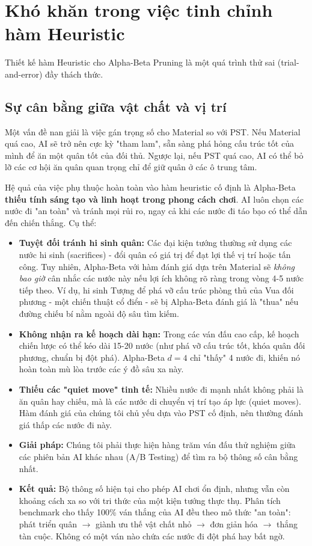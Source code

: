 \section{Khó khăn trong việc tinh chỉnh hàm Heuristic}

Thiết kế hàm Heuristic cho Alpha-Beta Pruning là một quá trình thử sai (trial-and-error) đầy thách thức. 

\subsection{Sự cân bằng giữa vật chất và vị trí}
Một vấn đề nan giải là việc gán trọng số cho Material so với PST. Nếu Material quá cao, AI sẽ trở nên cực kỳ "tham lam", sẵn sàng phá hỏng cấu trúc tốt của mình để ăn một quân tốt của đối thủ. Ngược lại, nếu PST quá cao, AI có thể bỏ lỡ các cơ hội ăn quân quan trọng chỉ để giữ quân ở các ô trung tâm. 

Hệ quả của việc phụ thuộc hoàn toàn vào hàm heuristic cố định là Alpha-Beta \textbf{thiếu tính sáng tạo và linh hoạt trong phong cách chơi}. AI luôn chọn các nước đi "an toàn" và tránh mọi rủi ro, ngay cả khi các nước đi táo bạo có thể dẫn đến chiến thắng. Cụ thể:

\begin{itemize}
    \item \textbf{Tuyệt đối tránh hi sinh quân:} Các đại kiện tướng thường sử dụng các nước hi sinh (sacrifices) - đổi quân có giá trị để đạt lợi thế vị trí hoặc tấn công. Tuy nhiên, Alpha-Beta với hàm đánh giá dựa trên Material sẽ \textit{không bao giờ} cân nhắc các nước này nếu lợi ích không rõ ràng trong vòng 4-5 nước tiếp theo. Ví dụ, hi sinh Tượng để phá vỡ cấu trúc phòng thủ của Vua đối phương - một chiến thuật cổ điển - sẽ bị Alpha-Beta đánh giá là "thua" nếu đường chiếu bí nằm ngoài độ sâu tìm kiếm.
    
    \item \textbf{Không nhận ra kế hoạch dài hạn:} Trong các ván đấu cao cấp, kế hoạch chiến lược có thể kéo dài 15-20 nước (như phá vỡ cấu trúc tốt, khóa quân đối phương, chuẩn bị đột phá). Alpha-Beta $d=4$ chỉ "thấy" 4 nước đi, khiến nó hoàn toàn mù lòa trước các ý đồ sâu xa này.
    
    \item \textbf{Thiếu các "quiet move" tinh tế:} Nhiều nước đi mạnh nhất không phải là ăn quân hay chiếu, mà là các nước di chuyển vị trí tạo áp lực (quiet moves). Hàm đánh giá của chúng tôi chủ yếu dựa vào PST cố định, nên thường đánh giá thấp các nước đi này.
    
    \item \textbf{Giải pháp:} Chúng tôi phải thực hiện hàng trăm ván đấu thử nghiệm giữa các phiên bản AI khác nhau (A/B Testing) để tìm ra bộ thông số cân bằng nhất.
    \item \textbf{Kết quả:} Bộ thông số hiện tại cho phép AI chơi ổn định, nhưng vẫn còn khoảng cách xa so với tri thức của một kiện tướng thực thụ. Phân tích benchmark cho thấy 100\% ván thắng của AI đều theo mô thức "an toàn": phát triển quân $\rightarrow$ giành ưu thế vật chất nhỏ $\rightarrow$ đơn giản hóa $\rightarrow$ thắng tàn cuộc. Không có một ván nào chứa các nước đi đột phá hay bất ngờ.
\end{itemize}

